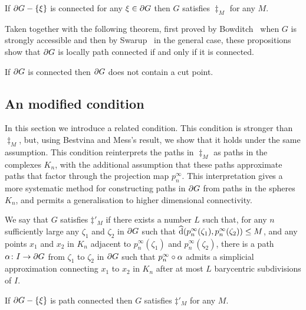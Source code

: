 \documentclass[a4paper]{article}
\begin{document}
\begin{proposition}
  If $\partial G - \left\{\xi\right\}$ is connected for any $\xi \in \partial G$ then
  $G$ satisfies $\ddag_M$ for any $M$.
\end{proposition}

Taken together with the following theorem, first proved by
Bowditch~\cite{bowditch98b} when $G$ is strongly accessible and then by
Swarup~\cite{swarup96} in the general case, these propositions show that
$\partial G$ is locally path connected if and only if it is connected.

\begin{theorem}\cite{bowditch98b,swarup96}
  If $\partial G$ is connected then $\partial G$ does not contain a cut
  point.
\end{theorem}

\subsection{An modified condition}

In this section we introduce a related condition. This condition is stronger
than $\ddag_M$, but, using Bestvina and Mess's result, we show that it holds
under the same assumption. This condition reinterprets the paths in $\ddag_M$
as paths in the complexes $K_n$, with the additional assumption that these
paths approximate paths that factor through the projection map $p^\infty_n$.
This interpretation gives a more systematic method for constructing paths in
$\partial G$ from paths in the spheres $K_n$, and permits a generalisation to
higher dimensional connectivity.

\begin{definition}
  We say that $G$ satisfies $\ddag'_M$ if there exists a number $L$ such that,
  for any $n$ sufficiently large any $\zeta_1$ and $\zeta_2$ in $\partial G$
  such that $\operatorname{\widehat{d}}(p^\infty_n(\zeta_1), p^\infty_n(\zeta_2)) \leq M$, and
  any points $x_1$ and $x_2$ in $K_n$ adjacent to $p^\infty_n(\zeta_1)$ and
  $p^\infty_n(\zeta_2)$, there is a path $\alpha\colon I\to \partial G$ from
  $\zeta_1$ to $\zeta_2$ in $\partial G$ such that $p^\infty_n\circ\alpha$
  admits a simplicial approximation connecting $x_1$ to $x_2$ in $K_n$ after at
  most $L$ barycentric subdivisions of $I$.
\end{definition}

\begin{proposition}
  If $\partial G - \left\{\xi\right\}$ is path connected then $G$ satisfies $\ddag'_M$
  for any $M$.
\end{proposition}
\end{document}
